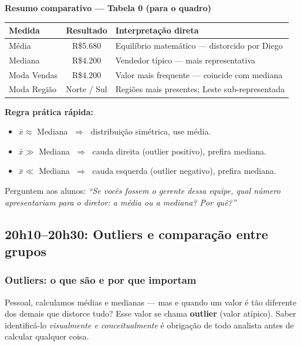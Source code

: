 \begin{BoardBox}
\textbf{Resumo comparativo — Tabela 0 (para o quadro)}
\begin{tabular}{|l|c|p{7.5cm}|}
\hline
\textbf{Medida} & \textbf{Resultado} & \textbf{Interpretação direta} \\
\hline
Média       & R\$5.680 & Equilíbrio matemático — distorcido por Diego \\
Mediana     & R\$4.200 & Vendedor típico — mais representativa \\
Moda Vendas & R\$4.200 & Valor mais frequente — coincide com mediana \\
Moda Região & Norte / Sul & Regiões mais presentes; Leste sub-representada \\
\hline
\end{tabular}

\medskip
\textbf{Regra prática rápida:}
\begin{itemize}
  \item $\bar{x} \approx$ Mediana $\;\Rightarrow\;$ distribuição simétrica, use média.
  \item $\bar{x} \gg$ Mediana $\;\Rightarrow\;$ cauda direita (outlier positivo), prefira mediana.
  \item $\bar{x} \ll$ Mediana $\;\Rightarrow\;$ cauda esquerda (outlier negativo), prefira mediana.
\end{itemize}
\end{BoardBox}

Perguntem aos alunos: \textit{``Se vocês fossem o gerente dessa equipe, qual
número apresentariam para o diretor: a média ou a mediana? Por quê?''}

\subsection{20h10–20h30: Outliers e comparação entre grupos}

\subsubsection*{Outliers: o que são e por que importam}

Pessoal, calculamos médias e medianas — mas e quando um valor é tão diferente
dos demais que distorce tudo? Esse valor se chama \textbf{outlier} (valor atípico).
Saber identificá-lo \emph{visualmente e conceitualmente} é obrigação de todo
analista antes de calcular qualquer coisa.

